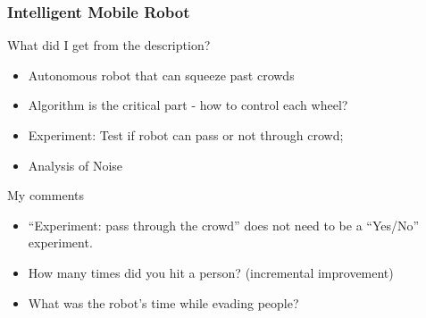 \documentclass[10pt]{beamer}
\begin{document}
\begin{frame}
  \frametitle{Intelligent Mobile Robot}
  \begin{block}{What did I get from the description?}
    \begin{itemize}
    \item Autonomous robot that can squeeze past crowds
    \item Algorithm is the critical part - how to control each wheel?
    \item Experiment: Test if robot can pass or not through crowd;
    \item Analysis of Noise
    \end{itemize}
  \end{block}
  \begin{block}{My comments}
    \begin{itemize}
    \item ``Experiment: pass through the crowd'' does not need to be a
      ``Yes/No'' experiment.
    \item How many times did you hit a person? (incremental improvement)
    \item What was the robot's time while evading people?
    \end{itemize}
  \end{block}
\end{frame}
\end{document}
